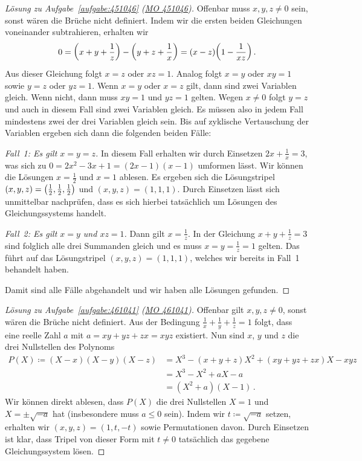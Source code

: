 \begin{proof}[Lösung zu Aufgabe~\ref{aufgabe:451046} \textmd{(\href{https://www.mathematik-olympiaden.de/moev/index.php?option=com_download&thema=a&format=raw&datei=A45104b.pdf}{MO 451046})}]
	Offenbar muss $x,y,z\neq 0$ sein, sonst wären die Brüche nicht definiert. Indem wir die ersten beiden Gleichungen voneinander subtrahieren, erhalten wir
	\begin{equation*}
		0=\parens*{x+y+\frac1z}-\parens*{y+z+\frac 1x}=(x-z)\parens*{1-\frac{1}{xz}}\,.
	\end{equation*}
	Aus dieser Gleichung folgt $x=z$ oder $xz=1$. Analog folgt $x=y$ oder $xy=1$ sowie $y=z$ oder $yz=1$. Wenn $x=y$ oder $x=z$ gilt, dann sind zwei Variablen gleich. Wenn nicht, dann muss $xy=1$ und $yz=1$ gelten. Wegen $x\neq 0$ folgt $y=z$ und auch in diesem Fall sind zwei Variablen gleich. Es müssen also in jedem Fall mindestens zwei der drei Variablen gleich sein. Bis auf zyklische Vertauschung der Variablen ergeben sich dann die folgenden beiden Fälle:
	
	\emph{Fall~1: Es gilt $x=y=z$.} In diesem Fall erhalten wir durch Einsetzen $2x+\frac 1x=3$, was sich zu $0=2x^2-3x+1=(2x-1)(x-1)$ umformen lässt. Wir können die Lösungen $x=\frac12$ und $x=1$ ablesen. Es ergeben sich die Lösungstripel $(x,y,z)=\parens[\big]{\frac12,\frac12,\frac12}$ und $(x,y,z)=(1,1,1)$. Durch Einsetzen lässt sich unmittelbar nachprüfen, dass es sich hierbei tatsächlich um Lösungen des Gleichungssystems handelt.
	
	\emph{Fall~2: Es gilt $x=y$ und $xz=1$.} Dann gilt $x=\frac 1z$. In der Gleichung $x+y+\frac 1z=3$ sind folglich alle drei Summanden gleich und es muss $x=y=\frac 1z=1$ gelten. Das führt auf das Lösungstripel $(x,y,z)=(1,1,1)$, welches wir bereits in Fall~1 behandelt haben.
	
	Damit sind alle Fälle abgehandelt und wir haben alle Lösungen gefunden.
\end{proof}
\begin{proof}[Lösung zu Aufgabe~\ref{aufgabe:461041} \textmd{(\href{https://www.mathematik-olympiaden.de/moev/index.php?option=com_download&thema=a&format=raw&datei=A46104a.pdf}{MO 461041})}]
	Offenbar gilt $x,y,z\neq 0$, sonst wären die Brüche nicht definiert. Aus der Bedingung $\frac 1x+\frac 1y+\frac 1z=1$ folgt, dass eine reelle Zahl $a$ mit $a=xy+yz+zx=xyz$ existiert. Nun sind $x$, $y$ und $z$ die drei Nullstellen des Polynoms
	\begin{align*}
		P(X)\coloneqq (X-x)(X-y)(X-z)&=X^3-(x+y+z)X^2+(xy+yz+zx)X-xyz\\
		&=X^3-X^2+aX-a\\
		&=(X^2+a)(X-1)\,.
	\end{align*}
	Wir können direkt ablesen, dass $P(X)$ die drei Nullstellen $X=1$ und $X=\pm\sqrt{-a}$ hat (insbesondere muss $a\leqslant 0$ sein). Indem wir $t\coloneqq \sqrt{-a}$ setzen, erhalten wir $(x,y,z)=(1,t,-t)$ sowie Permutationen davon. Durch Einsetzen ist klar, dass Tripel von dieser Form mit $t\neq 0$ tatsächlich das gegebene Gleichungssystem lösen.
\end{proof}
